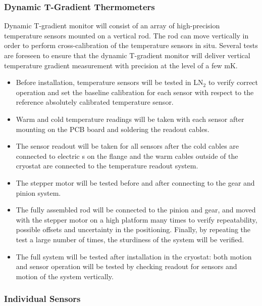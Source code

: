 \subsubsection{Dynamic T-Gradient Thermometers}
\label{sec:fdgen-slow-cryo-qc-thdy}

Dynamic T-gradient monitor will consist of an array of high-precision temperature sensors mounted on a vertical rod. The rod can move vertically in order to perform cross-calibration of the temperature sensors in situ. Several tests are foreseen to ensure that the dynamic T-gradient monitor will deliver vertical temperature gradient measurement with precision at the level of a few \si{mK}.

\begin{itemize}
\item
Before installation, temperature sensors will be tested in LN$_2$ to verify correct operation and set the baseline calibration for each sensor with respect to the reference absolutely calibrated temperature sensor. 
\item
Warm and cold temperature readings will be taken with each sensor after mounting on the PCB board and soldering %
the readout cables.
\item
The sensor readout will be taken for all sensors after the cold cables are connected to electric \fdth{}s on the flange and the warm cables outside of the cryostat are connected to the temperature readout system.
\item 
The stepper motor will be tested before and after connecting to the gear and pinion system.
\item
The fully assembled rod will be connected to the pinion and gear, and moved with the stepper motor on a high platform many times to verify repeatability, possible offsets and uncertainty in the positioning. Finally, by repeating the test a large number of times, the sturdiness of the system will be verified.
\item
The full system will be tested after installation in the cryostat: both motion and sensor operation will be tested by checking readout for sensors and motion of the system vertically. 
\end{itemize} 

\subsubsection{Individual Sensors}
\label{sec:fdgen-slow-cryo-qc-is}

